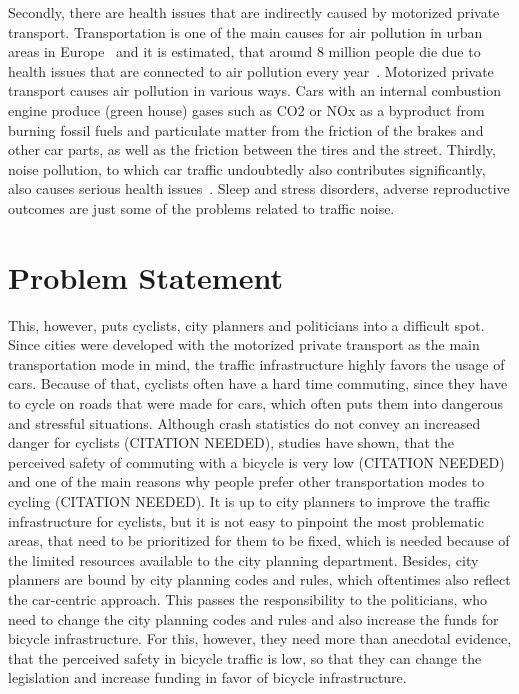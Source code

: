 Secondly, there are health issues that are indirectly caused by motorized private transport.
Transportation is one of the main causes for air pollution in urban areas in Europe~\cite{european2019european} and it is estimated, that around 8 million people die due to health issues that are connected to air pollution every year~\cite{forouzanfar2016global}. 
Motorized private transport causes air pollution in various ways.
Cars with an internal combustion engine produce (green house) gases such as CO2 or NOx as a byproduct from burning fossil fuels and particulate matter from the friction of the brakes and other car parts, as well as the friction between the tires and the street.
Thirdly, noise pollution, to which car traffic undoubtedly also contributes significantly, also causes serious health issues~\cite{khreis2016health}.
Sleep and stress disorders, adverse reproductive outcomes are just some of the problems related to traffic noise.


\section{Problem Statement}
\label{sec:problem}
This, however, puts cyclists, city planners and politicians into a difficult spot.
Since cities were developed with the motorized private transport as the main transportation mode in mind, the traffic infrastructure highly favors the usage of cars.
Because of that, cyclists often have a hard time commuting, since they have to cycle on roads that were made for cars, which often puts them into dangerous and stressful situations.
Although crash statistics do not convey an increased danger for cyclists (CITATION NEEDED), studies have shown, that the perceived safety of commuting with a bicycle is very low (CITATION NEEDED) and one of the main reasons why people prefer other transportation modes to cycling (CITATION NEEDED).
It is up to city planners to improve the traffic infrastructure for cyclists, but it is not easy to pinpoint the most problematic areas, that need to be prioritized for them to be fixed, which is needed because of the limited resources available to the city planning department.
Besides, city planners are bound by city planning codes and rules, which oftentimes also reflect the car-centric approach.
This passes the responsibility to the politicians, who need to change the city planning codes and rules and also increase the funds for bicycle infrastructure.
For this, however, they need more than anecdotal evidence, that the perceived safety in bicycle traffic is low, so that they can change the legislation and increase funding in favor of bicycle infrastructure.

